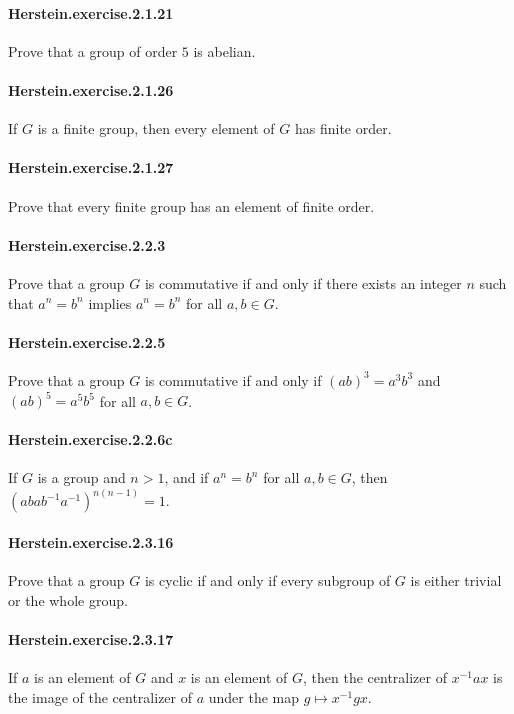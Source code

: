 \documentclass{article}
\begin{document}
\paragraph{Herstein.exercise.2.1.21} Prove that a group of order $5$ is abelian.

\paragraph{Herstein.exercise.2.1.26} If $G$ is a finite group, then every element of $G$ has finite order.

\paragraph{Herstein.exercise.2.1.27} Prove that every finite group has an element of finite order.

\paragraph{Herstein.exercise.2.2.3} Prove that a group $G$ is commutative if and only if there exists an integer $n$ such that $a^n=b^n$ implies $a^n=b^n$ for all $a, b \in G$.

\paragraph{Herstein.exercise.2.2.5} Prove that a group $G$ is commutative if and only if $(ab)^3=a^3b^3$ and $(ab)^5=a^5b^5$ for all $a, b \in G$.

\paragraph{Herstein.exercise.2.2.6c} If $G$ is a group and $n>1$, and if $a^n=b^n$ for all $a,b\in G$, then $(abab^{-1}a^{-1})^{n(n-1)}=1$.

\paragraph{Herstein.exercise.2.3.16} Prove that a group $G$ is cyclic if and only if every subgroup of $G$ is either trivial or the whole group.

\paragraph{Herstein.exercise.2.3.17} If $a$ is an element of $G$ and $x$ is an element of $G$, then the centralizer of $x^{-1}ax$ is the image of the centralizer of $a$ under the map $g\mapsto x^{-1}gx$.
\end{document}
